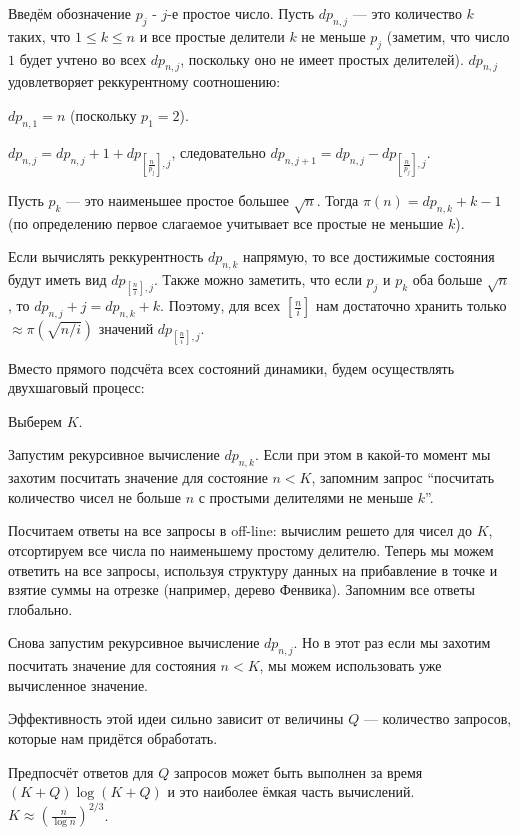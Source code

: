 
Введём обозначение $p_j$ - $j$-е простое число. Пусть $dp_{n,j}$ — это количество $k$ таких, что $1 \leq k \leq n$ и все простые делители $k$ не меньше $p_j$ (заметим, что число $1$ будет учтено во всех $dp_{n,j}$, поскольку оно не имеет простых делителей). $dp_{n, j}$ удовлетворяет реккурентному соотношению:

$dp_{n,1} = n$ (поскольку $p_1=2$).

$dp_{n, j} = dp_{n, j} + 1 + dp_{\left[ \frac{n}{p_j}\right], j}$, следовательно $dp_{n, j + 1} = dp_{n, j} - dp_{\left[\frac{n}{p_j}\right], j}$.

Пусть $p_k$ — это наименьшее простое большее $\sqrt{n}$. Тогда $\pi(n) = dp_{n, k} + k - 1$ (по определению первое слагаемое учитывает все простые не меньшие $k$).

Если вычислять реккурентность $dp_{n, k}$ напрямую, то все достижимые состояния будут иметь вид $dp_{\left[ \frac{n}{i}\right], j}$. Также можно заметить, что если $p_j$ и $p_k$ оба больше $\sqrt{n}$, то $dp_{n, j} + j = dp_{n, k} + k$. Поэтому, для всех $\left[\frac{n}{i}\right]$ нам достаточно хранить только $\approx\pi(\sqrt{n/i})$ значений $dp_{\left[ \frac{n}{i}\right], j}$.

Вместо прямого подсчёта всех состояний динамики, будем осуществлять двухшаговый процесс:

Выберем $K$.

Запустим рекурсивное вычисление $dp_{n, k}$. Если при этом в какой-то момент мы захотим посчитать значение для состояние $n < K$, запомним запрос ``посчитать количество чисел не больше $n$ с простыми делителями не меньше $k$''.

Посчитаем ответы на все запросы в off-line: вычислим решето для чисел до $K$, отсортируем все числа по наименьшему простому делителю. Теперь мы можем ответить на все запросы, используя структуру данных на прибавление в точке и взятие суммы на отрезке (например, дерево Фенвика). Запомним все ответы глобально.

Снова запустим рекурсивное вычисление $dp_{n, j}$. Но в этот раз если мы захотим посчитать значение для состояния $n < K$, мы можем использовать уже вычисленное значение.

Эффективность этой идеи сильно зависит от величины $Q$ — количество запросов, которые нам придётся обработать.


Предпосчёт ответов для $Q$ запросов может быть выполнен за время $(K + Q)\log(K + Q)$ и это наиболее ёмкая часть вычислений. $K\approx\left(\frac{n}{\log n}\right)^{2/3}$.
